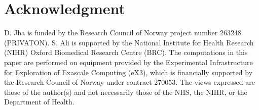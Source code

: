 \documentclass[journal]{IEEEtran}
\begin{document}
\section*{Acknowledgment}
D. Jha is funded by the Research Council of Norway project number 263248 (PRIVATON).  S. Ali is supported by the National Institute for Health Research (NIHR) Oxford Biomedical Research Centre (BRC). The computations in this paper are performed on equipment provided by the Experimental Infrastructure for Exploration of Exascale Computing (eX3), which is financially supported by the Research Council of Norway under contract 270053. The views expressed are those of the author(s) and not necessarily those of the NHS, the NIHR, or the Department of Health. 


 
\end{document}
